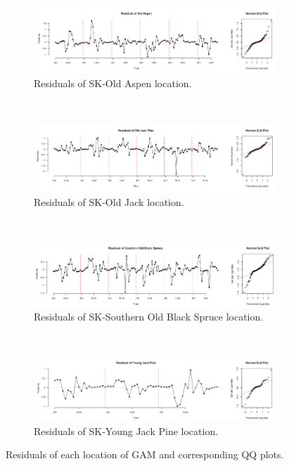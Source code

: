 \documentclass{article}\usepackage[]{graphicx}\usepackage[]{color}
\begin{document}
\begin{figure}[!ht]
    \centering
    \begin{subfigure}[ht]{0.85\textwidth}
        \includegraphics[width=\textwidth]{resOAP.png}
        \caption{Residuals of SK-Old Aspen location.}
    \end{subfigure}
    ~ 
    \begin{subfigure}[ht]{0.85\textwidth}
        \includegraphics[width=\textwidth]{resOJP.png}
        \caption{Residuals of SK-Old Jack location.}
     \end{subfigure}
        ~ 
      \begin{subfigure}[ht]{0.85\textwidth}
        \includegraphics[width=\textwidth]{resSOU.png}
        \caption{Residuals of SK-Southern Old Black Spruce location.}
     \end{subfigure}
     ~
      \begin{subfigure}[ht]{0.85\textwidth}
        \includegraphics[width=\textwidth]{resYJP.png}
        \caption{Residuals of SK-Young Jack Pine location.}
     \end{subfigure}
    \caption{Residuals of each location of GAM and corresponding QQ plots.}\label{Fig:EachRes}
\end{figure}
\end{document}
